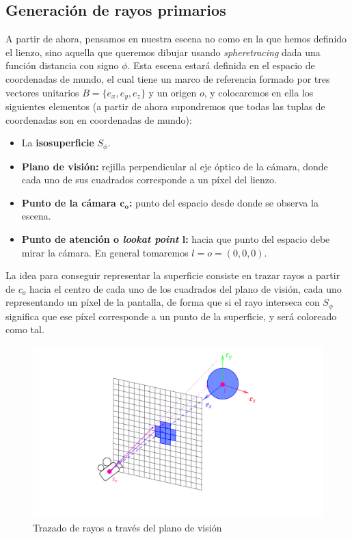 \subsection{Generación de rayos primarios}
A partir de ahora, pensamos en nuestra escena no como en la que hemos definido el lienzo, sino aquella que queremos dibujar usando \textit{spheretracing} dada una función distancia con signo $\phi$. Esta escena estará definida en el espacio de coordenadas de mundo, el cual tiene un marco de referencia formado por tres vectores unitarios $B=\{e_x,e_y,e_z\}$ y un origen $o$, y colocaremos en ella los siguientes elementos (a partir de ahora supondremos que todas las tuplas de coordenadas son en coordenadas de mundo):
\begin{itemize}
    \item La \textbf{isosuperficie} $S_{\phi}$.
    \item \textbf{Plano de visión:} rejilla perpendicular al eje óptico de la cámara, donde cada uno de sus cuadrados corresponde a un píxel del lienzo.
    \item \textbf{Punto de la cámara $\boldsymbol{c_o}$:} punto del espacio desde donde se observa la escena.
    \item \textbf{Punto de atención o \textit{lookat point} $\boldsymbol{l}$:} hacia que punto del espacio debe mirar la cámara. En general tomaremos $l=o=(0,0,0)$.
\end{itemize}
La idea para conseguir representar la superficie consiste en trazar rayos a partir de $c_o$ hacia el centro de cada uno de los cuadrados del plano de visión, cada uno representando un píxel de la pantalla, de forma que si el rayo interseca con $S_\phi$ significa que ese píxel corresponde a un punto de la superficie, y será coloreado como tal.
\begin{figure}[h]
    \centering
    \includegraphics[width=\textwidth]{Plantilla-TFG-master/img/raymarch_fix.png}
    \caption{Trazado de rayos a través del plano de visión}
    \label{fig:raymarch1}
\end{figure}
\newline

